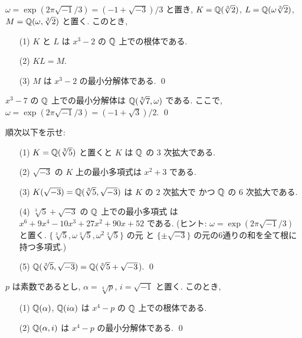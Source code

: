 \documentclass[12pt,twoside]{jarticle}
\begin{document}
\begin{question}
  $\omega = \exp(2\pi\sqrt{-1}/3) = (-1+\sqrt{-3})/3$ と置き,
  $K={\mathbb Q}(\sqrt[3]{2})$, $L={\mathbb Q}(\omega\sqrt[3]{2})$, $M={\mathbb Q}(\omega,\sqrt[3]{2})$ 
  と置く. このとき,
  \begin{itemize}
  \item[(1)] $K$ と $L$ は $x^3-2$ の ${\mathbb Q}$ 上での根体である.
  \item[(2)] $KL=M$.
  \item[(3)] $M$ は $x^3-2$ の最小分解体である. \qed
  \end{itemize}
\end{question}

\begin{question}
  $x^3 - 7$ の ${\mathbb Q}$ 上での最小分解体は ${\mathbb Q}(\sqrt[3]{7},\omega)$ である.
  ここで, $\omega=\exp(2\pi\sqrt{-1}/3)=(-1+\sqrt{3})/2$. \qed
\end{question}

\begin{question}
  順次以下を示せ:
  \begin{itemize}
  \item[(1)] $K={\mathbb Q}(\sqrt[3]{5})$ と置くと $K$ は ${\mathbb Q}$ の $3$ 次拡大である.
  \item[(2)] $\sqrt{-3}$ の $K$ 上の最小多項式は $x^2+3$ である.
  \item[(3)] $K(\sqrt{-3})={\mathbb Q}(\sqrt[3]{5},\sqrt{-3})$ は $K$ の $2$ 次拡大で
    かつ ${\mathbb Q}$ の $6$ 次拡大である.
  \item[(4)]   $\sqrt[3]{5}+\sqrt{-3}$ の ${\mathbb Q}$ 上での最小多項式
    は $x^6+9x^4-10x^3+27x^2+90x+52$ である.
    (ヒント: $\omega=\exp(2\pi\sqrt{-1}/3)$ と置く.
    $\{\sqrt[3]{5},\omega\sqrt[3]{5},\omega^2\sqrt[3]{5}\}$ の元
    と $\{\pm\sqrt{-3}\}$ の元の6通りの和を全て根に持つ多項式.) 
  \item[(5)] ${\mathbb Q}(\sqrt[3]{5},\sqrt{-3})={\mathbb Q}(\sqrt[3]{5}+\sqrt{-3}$).
    \qed
  \end{itemize}
\end{question}

\begin{question}
  $p$ は素数であるとし, $\alpha=\sqrt[4]{p}$, $i=\sqrt{-1}$ と置く.
  このとき,
  \begin{itemize}
  \item[(1)] ${\mathbb Q}(\alpha)$, ${\mathbb Q}(i\alpha)$ は $x^4-p$ の ${\mathbb Q}$ 上での根体である.
  \item[(2)] ${\mathbb Q}(\alpha, i)$ は $x^4-p$ の最小分解体である. 
    \qed
  \end{itemize}
\end{question}
\end{document}
